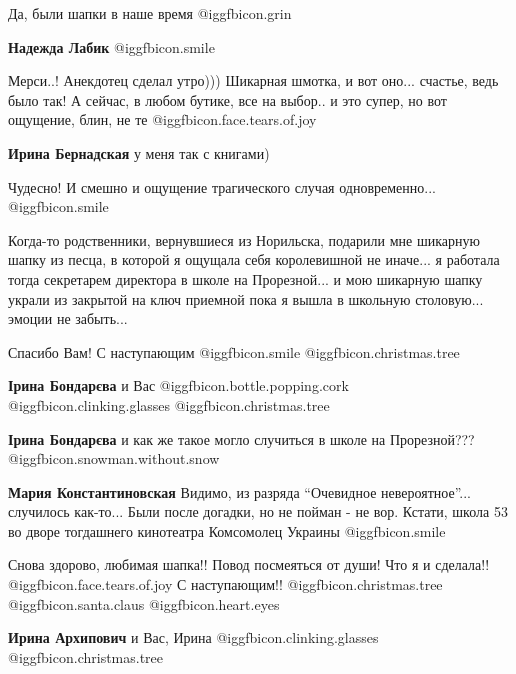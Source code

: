 \begin{itemize}
Да, были шапки в наше время @igg{fbicon.grin} 

\textbf{Надежда Лабик}  @igg{fbicon.smile} 


Мерси..! Анекдотец сделал утро))) Шикарная шмотка, и вот оно... счастье, ведь
было так! А сейчас, в любом бутике, все на выбор.. и это супер, но вот ощущение,
блин, не те @igg{fbicon.face.tears.of.joy} 

\textbf{Ирина Бернадская} у меня так с книгами)


Чудесно! И смешно и ощущение трагического случая одновременно... @igg{fbicon.smile} 

Когда-то родственники, вернувшиеся из Норильска, подарили мне шикарную шапку из
песца, в которой я ощущала себя королевишной не иначе... я работала тогда
секретарем директора в школе на Прорезной... и мою шикарную шапку украли из
закрытой на ключ приемной пока я вышла в школьную столовую... эмоции не
забыть...

Спасибо Вам! С наступающим @igg{fbicon.smile}  @igg{fbicon.christmas.tree} 

\begin{itemize} %
\textbf{Ірина Бондарєва}
и Вас  @igg{fbicon.bottle.popping.cork}   @igg{fbicon.clinking.glasses}   @igg{fbicon.christmas.tree} 

\textbf{Ірина Бондарєва} и как же такое могло случиться в школе на Прорезной??? @igg{fbicon.snowman.without.snow} ️

\textbf{Мария Константиновская} Видимо, из разряда \enquote{Очевидное невероятное}... случилось как-то...
Были после догадки, но не пойман - не вор.
Кстати, школа 53 во дворе тогдашнего кинотеатра Комсомолец Украины @igg{fbicon.smile} 
\end{itemize} %


Снова здорово, любимая шапка!! Повод посмеяться от души! Что я и сделала!!  @igg{fbicon.face.tears.of.joy} С
наступающим!!  @igg{fbicon.christmas.tree}  @igg{fbicon.santa.claus}  @igg{fbicon.heart.eyes} 

\begin{itemize} %
\textbf{Ирина Архипович} и Вас, Ирина  @igg{fbicon.clinking.glasses}   @igg{fbicon.christmas.tree} 


\end{itemize}
\end{itemize}
